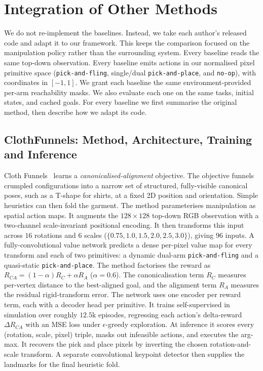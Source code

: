 \documentclass[journal]{IEEEtran}
\begin{document}
\section{Integration of Other Methods}
We do not re-implement the baselines. Instead, we take each author's released code and adapt it to our framework. This keeps the comparison focused on the manipulation policy rather than the surrounding system. Every baseline reads the same top-down observation. Every baseline emits actions in our normalised pixel primitive space (\texttt{pick-and-fling}, single/dual \texttt{pick-and-place}, and \texttt{no-op}), with coordinates in $[-1,1]$. We grant each baseline the same environment-provided per-arm reachability masks. We also evaluate each one on the same tasks, initial states, and cached goals. For every baseline we first summarise the original method, then describe how we adapt its code.

\subsection{ClothFunnels: Method, Architecture, Training and Inference}
Cloth Funnels~\cite{canberk2022cloth} learns a \emph{canonicalised-alignment} objective. The objective funnels crumpled configurations into a narrow set of structured, fully-visible canonical poses, such as a T-shape for shirts, at a fixed 2D position and orientation. Simple heuristics can then fold the garment. The method parameterises manipulation as spatial action maps. It augments the $128{\times}128$ top-down RGB observation with a two-channel scale-invariant positional encoding. It then transforms this input across $16$ rotations and $6$ scales ($\{0.75,1.0,1.5,2.0,2.5,3.0\}$), giving $96$ inputs. A fully-convolutional value network predicts a dense per-pixel value map for every transform and each of two primitives: a dynamic dual-arm \texttt{pick-and-fling} and a quasi-static \texttt{pick-and-place}. The method factorises the reward as $R_{CA}=(1-\alpha)R_{C}+\alpha R_{A}$ ($\alpha=0.6$). The canonicalisation term $R_{C}$ measures per-vertex distance to the best-aligned goal, and the alignment term $R_{A}$ measures the residual rigid-transform error. The network uses one encoder per reward term, each with a decoder head per primitive. It trains self-supervised in simulation over roughly $12.5$k episodes, regressing each action's delta-reward $\Delta R_{CA}$ with an MSE loss under $\epsilon$-greedy exploration. At inference it scores every (rotation, scale, pixel) triple, masks out infeasible actions, and executes the arg-max. It recovers the pick and place pixels by inverting the chosen rotation-and-scale transform. A separate convolutional keypoint detector then supplies the landmarks for the final heuristic fold.
\end{document}
